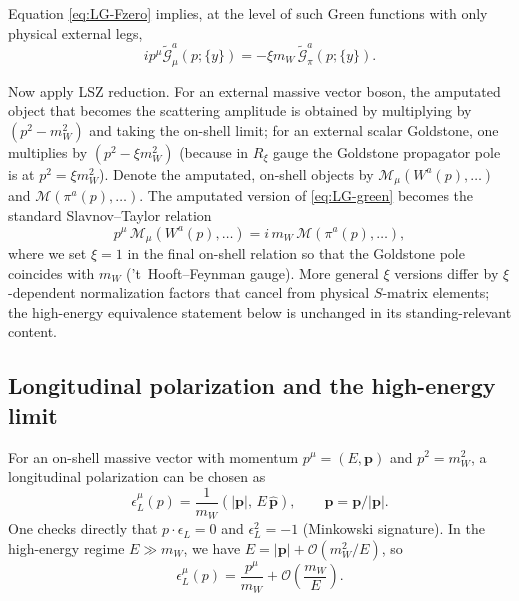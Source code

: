 \documentclass[11pt]{article}
\theoremstyle{remark}
\newcommand{\cO}{\mathcal{O}}
\begin{document}
Equation \eqref{eq:LG-Fzero} implies, at the level of such Green functions with only physical external
legs,
\begin{equation}\label{eq:LG-green}
i p^\mu \widetilde{\mathcal{G}}^{a}_{\mu}(p;\{y\}) = -\xi m_W\,\widetilde{\mathcal{G}}^{a}_{\pi}(p;\{y\}).
\end{equation}

Now apply LSZ reduction. For an external massive vector boson, the amputated object that becomes the
scattering amplitude is obtained by multiplying by $(p^2-m_W^2)$ and taking the on-shell limit; for an
external scalar Goldstone, one multiplies by $(p^2-\xi m_W^2)$ (because in $R_\xi$ gauge the Goldstone
propagator pole is at $p^2=\xi m_W^2$).
Denote the amputated, on-shell objects by $\mathcal{M}_\mu(W^a(p),\dots)$ and
$\mathcal{M}(\pi^a(p),\dots)$. The amputated version of \eqref{eq:LG-green} becomes the standard
Slavnov--Taylor relation
\begin{equation}\label{eq:LG-ST}
p^\mu\,\mathcal{M}_\mu(W^a(p),\dots) = i\,m_W\,\mathcal{M}(\pi^a(p),\dots),
\end{equation}
where we set $\xi=1$ in the final on-shell relation so that the Goldstone pole coincides with $m_W$
('t~Hooft--Feynman gauge). More general $\xi$ versions differ by $\xi$-dependent normalization factors
that cancel from physical $S$-matrix elements; the high-energy equivalence statement below is unchanged
in its standing-relevant content.

\subsection{Longitudinal polarization and the high-energy limit}
For an on-shell massive vector with momentum $p^\mu=(E,\mathbf{p})$ and $p^2=m_W^2$, a longitudinal
polarization can be chosen as
\begin{equation}\label{eq:LG-epsL}
\epsilon_L^\mu(p)=\frac{1}{m_W}\left(|\mathbf{p}|,\,E\,\hat{\mathbf{p}}\right),
\qquad \hat{\mathbf{p}}=\mathbf{p}/|\mathbf{p}|.
\end{equation}
One checks directly that $p\cdot \epsilon_L=0$ and $\epsilon_L^2=-1$ (Minkowski signature).
In the high-energy regime $E\gg m_W$, we have $E=|\mathbf{p}|+\cO(m_W^2/E)$, so
\begin{equation}\label{eq:LG-epsapprox}
\epsilon_L^\mu(p)=\frac{p^\mu}{m_W}+\cO\!\left(\frac{m_W}{E}\right).
\end{equation}
\end{document}
